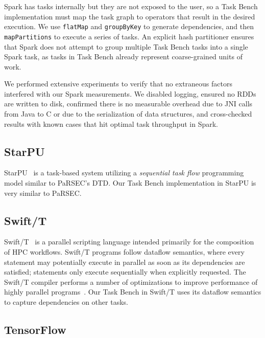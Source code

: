 Spark has tasks internally but they are not exposed to the user,
so a Task Bench implementation must map the task graph to operators that result in the
desired execution. We use
\lstinline[language=Scala]{flatMap} and
\lstinline[language=Scala]{groupByKey} to generate
dependencies, and then \lstinline[language=Scala]{mapPartitions} to execute a
series of tasks. An explicit hash partitioner ensures that
Spark does not attempt to group multiple Task Bench tasks into a
single Spark task, as tasks in Task Bench already represent coarse-grained units of work.

We performed extensive experiments to verify that no
extraneous factors interfered with our Spark measurements. We
disabled logging, ensured no RDDs are written
to disk, confirmed there is no measurable overhead due to JNI
calls from Java to C or due to the serialization of data structures, and cross-checked results with known cases
that hit optimal task throughput in Spark.

\subsection{StarPU}

StarPU~\cite{StarPU11} is a task-based system utilizing a \emph{sequential task flow}
programming model similar to PaRSEC's DTD. Our Task Bench implementation in
StarPU is very similar to PaRSEC.

\subsection{Swift/T}

Swift/T~\cite{Wozniak13} is a parallel scripting language intended
primarily for the composition of HPC workflows. Swift/T
programs follow dataflow semantics, where every statement may
potentially execute in parallel as soon as its dependencies are
satisfied; statements only execute sequentially when explicitly
requested. The Swift/T compiler performs a number of optimizations to
improve performance of highly parallel programs~\cite{Armstrong14}. 
Our Task Bench in Swift/T uses its dataflow
semantics to capture dependencies on other tasks.

\subsection{TensorFlow}

